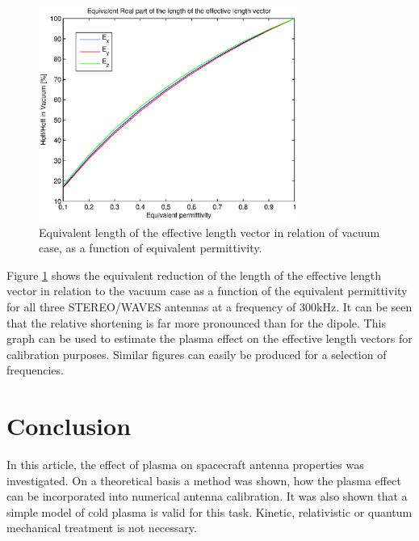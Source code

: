 \documentclass[two-column,ras]{agutex}
\begin{document}
\begin{article}
\begin{figure}
  \noindent\includegraphics[width=20pc]{heff_shortening_stereo.eps}
\caption{Equivalent length of the effective length vector in relation of vacuum case, as a function of equivalent permittivity.}
\label{fig:relative_heff_shortening_stereo}
\end{figure}

Figure \ref{fig:relative_heff_shortening_stereo} shows the equivalent reduction of the length of the effective length vector in relation to the vacuum case as a function of the equivalent permittivity for all three STEREO/WAVES antennas at a frequency of 300kHz. It can be seen that the relative shortening is far more pronounced than for the dipole. This graph can be used to estimate the plasma effect on the effective length vectors for calibration purposes. Similar figures can easily be produced for a selection of frequencies.\\

\section{Conclusion}
In this article, the effect of plasma on spacecraft antenna properties was investigated. On a theoretical basis a method was shown, how the plasma effect can be incorporated into numerical antenna calibration. It was also shown that a simple model of cold plasma is valid for this task. Kinetic, relativistic or quantum mechanical treatment is not necessary.\\


\end{article}
\end{document}
